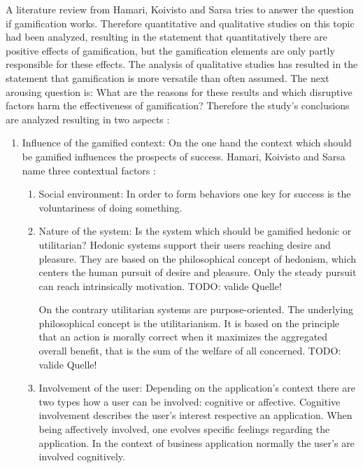 A literature review from Hamari, Koivisto and Sarsa \cite{hamariDoesGamificationWork2014} tries to answer the question if gamification works. Therefore quantitative and qualitative studies on this topic had been analyzed, resulting in the statement that quantitatively there are positive effects of gamification, but the gamification elements are only partly responsible for these effects. The analysis of qualitative studies has resulted in the statement that gamification is more versatile than often assumed. The next arousing question is: What are the reasons for these results and which disruptive factors harm the effectiveness of gamification? Therefore the study's conclusions are analyzed resulting in two aspects \cite[p. 3029, 3030]{hamariDoesGamificationWork2014}:
\begin{enumerate}
	\item Influence of the gamified context: \newline
	On the one hand the context which should be gamified influences the prospects of success.  Hamari, Koivisto and Sarsa name three contextual factors \cite[p. 3029, 3030]{hamariDoesGamificationWork2014}:
	\begin{enumerate}
		\item Social environment: \newline
		In order to form behaviors  one key for success is the voluntariness of doing something. \cite[p. 3030]{hamariDoesGamificationWork2014}
		
		\item Nature of the system: \newline
		Is the system which should be gamified hedonic or utilitarian? Hedonic systems support their users reaching desire and pleasure. \cite[p. 3030]{hamariDoesGamificationWork2014}
		They are based on the philosophical concept of hedonism, which centers the human pursuit of desire and pleasure. Only the steady pursuit can reach intrinsically motivation. TODO: valide Quelle!
		
		On the contrary utilitarian systems are purpose-oriented. The underlying philosophical concept is the utilitarianism. It is based on the principle that an action is morally correct when it maximizes the aggregated overall benefit, that is the sum of the welfare of all concerned. TODO: valide Quelle!
		
		\item Involvement of the user: \newline
		Depending on the application's context there are two types how a user can be involved: cognitive or affective. \cite[p. 3030]{hamariDoesGamificationWork2014} Cognitive involvement describes the user's interest respective an application. When being affectively involved, one evolves specific feelings regarding the application. In the context of business application normally the user's are involved cognitively. \cite{zaichkowskyPersonalInvolvementInventory2013}
	\end{enumerate}


\end{enumerate}
